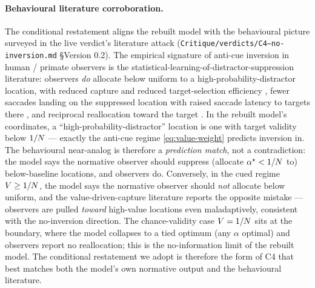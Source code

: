 \paragraph{Behavioural literature corroboration.}
The conditional restatement aligns the rebuilt model with the
behavioural picture surveyed in the live verdict's literature attack
(\texttt{Critique/verdicts/C4--no-inversion.md} §Version 0.2). The
empirical signature of anti-cue inversion in human / primate
observers is the statistical-learning-of-distractor-suppression
literature: observers \emph{do} allocate below uniform to a
high-probability-distractor location, with reduced capture and
reduced target-selection efficiency
\cite{wang_theeuwes2018_statistical_learning_distractor_suppression},
fewer saccades landing on the suppressed location with raised
saccade latency to targets there \cite{wang_samara_theeuwes2019},
and reciprocal reallocation toward the target
\cite{kong_li_wang_theeuwes2020}. In the rebuilt model's coordinates,
a ``high-probability-distractor'' location is one with target
validity below $1/N$ --- exactly the anti-cue regime
\eqref{eq:value-weight} predicts inversion in. The behavioural
near-analog is therefore a \emph{prediction match}, not a
contradiction: the model says the normative observer should
suppress (allocate $\alpha^\star < 1/N$ to) below-baseline
locations, and observers do. Conversely, in the cued regime
$V \ge 1/N$, the model says the normative observer should
\emph{not} allocate below uniform, and the value-driven-capture
literature \cite{failing_theeuwes2018_selection_history,
hickey2010_reward_salience_acc} reports the opposite mistake ---
observers are pulled \emph{toward} high-value locations even
maladaptively, consistent with the no-inversion direction. The
chance-validity case $V = 1/N$ \cite{posner1980_orienting}
sits at the boundary, where the model collapses to a tied optimum
(any $\alpha$ optimal) and observers report no reallocation; this is
the no-information limit of the rebuilt model. The conditional
restatement we adopt is therefore the form of C4 that best matches
both the model's own normative output and the behavioural literature.

